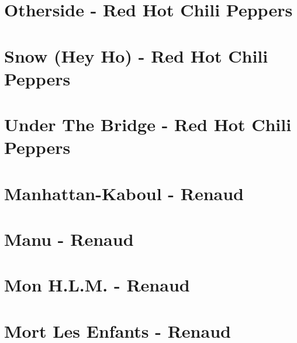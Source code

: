 \documentclass[11pt]{article}
\begin{document}
\section*{Otherside - Red Hot Chili Peppers}
\begin{guitar}

\end{guitar}

\section{Snow  (Hey Ho) - Red Hot Chili Peppers}
\begin{guitar}

\end{guitar}

\section*{Under The Bridge - Red Hot Chili Peppers}
\begin{guitar}

\end{guitar}



\section{Manhattan-Kaboul - Renaud}
\begin{guitar}

\end{guitar}

\section{Manu - Renaud}
\begin{guitar}

\end{guitar}

\section*{Mon H.L.M. - Renaud}
\begin{guitar}

\end{guitar}

\section{Mort Les Enfants - Renaud}
\begin{guitar}

\end{guitar}
\end{document}
